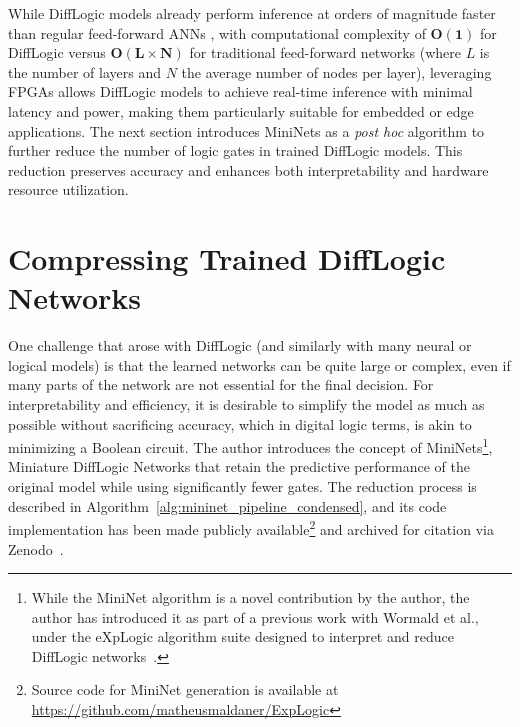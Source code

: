 While DiffLogic models already perform inference at orders of magnitude faster than regular feed-forward ANNs \cite{difflogic}, with computational complexity of $\boldsymbol{O(1)}$ for DiffLogic versus $\boldsymbol{O(L \times N)}$ for traditional feed-forward networks (where $L$ is the number of layers and $N$ the average number of nodes per layer), leveraging FPGAs allows DiffLogic models to achieve real-time inference with minimal latency and power, making them particularly suitable for embedded or edge applications. The next section introduces MiniNets as a \textit{post hoc} algorithm to further reduce the number of logic gates in trained DiffLogic models. This reduction preserves accuracy and enhances both interpretability and hardware resource utilization.




\section{Compressing Trained DiffLogic Networks}
\label{sec:mininets}

One challenge that arose with DiffLogic (and similarly with many neural or logical models) is that the learned networks can be quite large or complex, even if many parts of the network are not essential for the final decision. For interpretability and efficiency, it is desirable to simplify the model as much as possible without sacrificing accuracy, which in digital logic terms, is akin to minimizing a Boolean circuit. The author introduces the concept of MiniNets\footnote{While the MiniNet algorithm is a novel contribution by the author, the author has introduced it as part of a previous work with Wormald et al., under the eXpLogic algorithm suite designed to interpret and reduce DiffLogic networks~\cite{explogic}.}, Miniature DiffLogic Networks that retain the predictive performance of the original model while using significantly fewer gates. The reduction process is described in Algorithm~\ref{alg:mininet_pipeline_condensed}, and its code implementation has been made publicly available\footnote{Source code for MiniNet generation is available at \url{https://github.com/matheusmaldaner/ExpLogic}} and archived for citation via Zenodo~\cite{maldaner2025explogic}.

